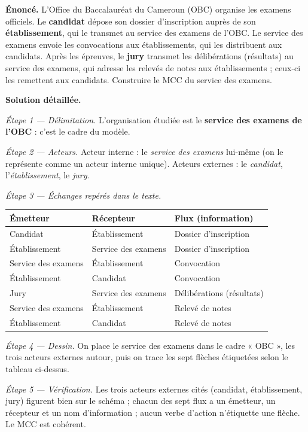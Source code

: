 \documentclass[11pt]{article}
\begin{document}
\begin{exoresolu}
\textbf{Énoncé.} L'Office du Baccalauréat du Cameroun (OBC) organise les examens officiels. Le \textbf{candidat} dépose son dossier d'inscription auprès de son \textbf{établissement}, qui le transmet au service des examens de l'OBC. Le service des examens envoie les convocations aux établissements, qui les distribuent aux candidats. Après les épreuves, le \textbf{jury} transmet les délibérations (résultats) au service des examens, qui adresse les relevés de notes aux établissements ; ceux-ci les remettent aux candidats. Construire le MCC du service des examens.

\tcblower
\textbf{Solution détaillée.}

\emph{Étape 1 — Délimitation.} L'organisation étudiée est le \textbf{service des examens de l'OBC} : c'est le cadre du modèle.

\emph{Étape 2 — Acteurs.} Acteur interne : le \emph{service des examens} lui-même (on le représente comme un acteur interne unique). Acteurs externes : le \emph{candidat}, l'\emph{établissement}, le \emph{jury}.

\emph{Étape 3 — Échanges repérés dans le texte.}

\begin{center}
\begin{tabularx}{\linewidth}{|l|l|X|}
\hline
\rowcolor{popblueL} \textbf{Émetteur} & \textbf{Récepteur} & \textbf{Flux (information)} \\
\hline
Candidat & Établissement & Dossier d'inscription \\
\hline
Établissement & Service des examens & Dossier d'inscription \\
\hline
Service des examens & Établissement & Convocation \\
\hline
Établissement & Candidat & Convocation \\
\hline
Jury & Service des examens & Délibérations (résultats) \\
\hline
Service des examens & Établissement & Relevé de notes \\
\hline
Établissement & Candidat & Relevé de notes \\
\hline
\end{tabularx}
\end{center}

\emph{Étape 4 — Dessin.} On place le service des examens dans le cadre « OBC », les trois acteurs externes autour, puis on trace les sept flèches étiquetées selon le tableau ci-dessus.

\emph{Étape 5 — Vérification.} Les trois acteurs externes cités (candidat, établissement, jury) figurent bien sur le schéma ; chacun des sept flux a un émetteur, un récepteur et un nom d'information ; aucun verbe d'action n'étiquette une flèche. Le MCC est cohérent.
\end{exoresolu}
\end{document}
